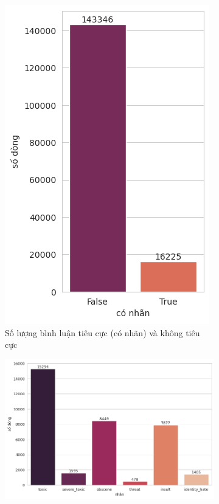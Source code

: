 \begin{figure}[htb!]
    \centering
    \begin{subfigure}[t]{0.3\textwidth}
        \centering
        \includegraphics[width=\textwidth]{image/number_of_records_has_label.png}
        \caption{Số lượng bình luận tiêu cực (có nhãn) và không tiêu cực}
    \end{subfigure}%
    \begin{subfigure}[t]{0.7\textwidth}
        \centering
        \includegraphics[width=\textwidth]{image/num_records_per_label.png}

\end{subfigure}
\end{figure}
